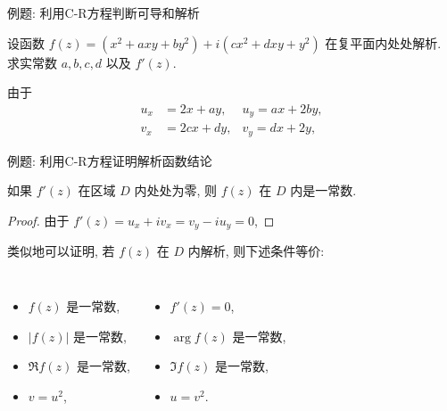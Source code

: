 \begin{frame}{例题: 利用C-R方程判断可导和解析}
\onslide<+->
\begin{example}
设函数 $f(z)=(x^2+axy+by^2)+i(cx^2+dxy+y^2)$ 在复平面内处处解析. 求实常数 $a,b,c,d$ 以及 $f'(z)$.
\end{example}
\onslide<+->
\begin{solution}
由于
\vspace{-\baselineskip}
\begin{align*}
u_x&=2x+ay,&u_y=ax+2by,\\
v_x&=2cx+dy,&v_y=dx+2y,
\end{align*}
\vspace{-\baselineskip}
\onslide<+->{\[a=d=2,\quad b=c=-1,\]}
\vspace{-\baselineskip}
\onslide<+->{\[f'(z)=u_x+iv_x=2x+2y+i(-2x+2y)=(2-2i)z.\]}
\vspace{-\baselineskip}
\end{solution}
\end{frame}


\begin{frame}[<*>]{例题: 利用C-R方程证明解析函数结论}
\onslide<+->
\begin{example}
如果 $f'(z)$ 在区域 $D$ 内处处为零, 则 $f(z)$ 在 $D$ 内是一常数.
\end{example}
\onslide<+->
\begin{proof}
由于 $f'(z)=u_x+iv_x=v_y-iu_y=0$,
\end{proof}
\onslide<+->
类似地可以证明, 若 $f(z)$ 在 $D$ 内解析, 则下述条件等价:
\onslide<+->
\begin{columns}
		\begin{itemize}
		\item $f(z)$ 是一常数,
		\item $|f(z)|$ 是一常数,
		\item $\Re{f(z)}$ 是一常数,
		\item $v=u^2$,
		\end{itemize}
		\begin{itemize}
		\item $f'(z)=0$,
		\item $\arg{f(z)}$ 是一常数,
		\item $\Im{f(z)}$ 是一常数,
		\item $u=v^2$.
		\end{itemize}
\end{columns}
\end{frame}


